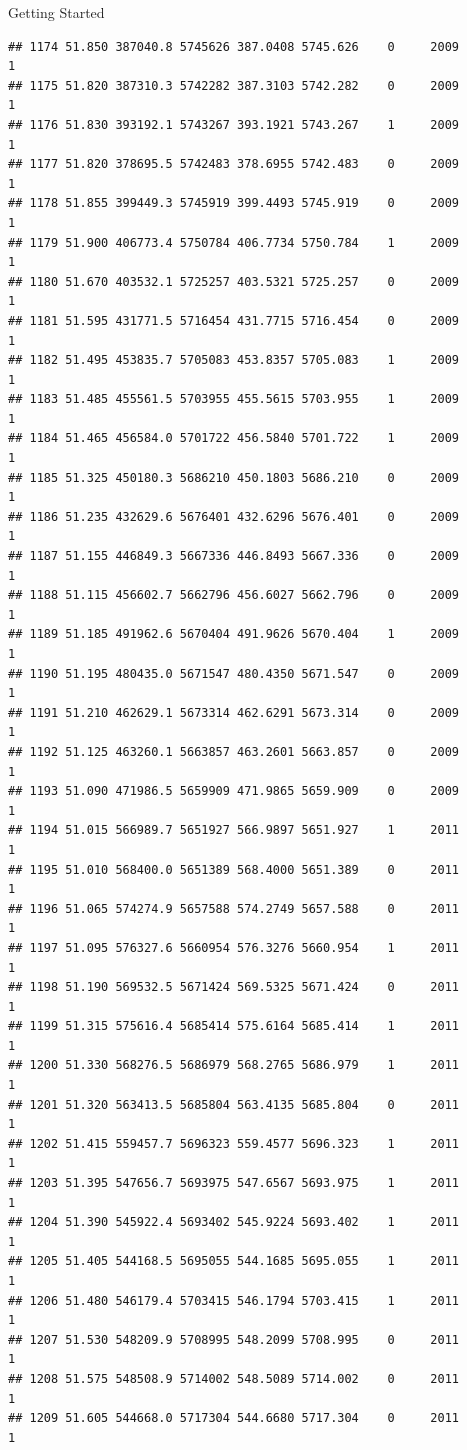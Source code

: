 \documentclass[
  ignorenonframetext,
]{beamer}
\begin{document}
\begin{frame}[fragile]{Getting Started}
\begin{verbatim}
## 1174 51.850 387040.8 5745626 387.0408 5745.626    0     2009        1
## 1175 51.820 387310.3 5742282 387.3103 5742.282    0     2009        1
## 1176 51.830 393192.1 5743267 393.1921 5743.267    1     2009        1
## 1177 51.820 378695.5 5742483 378.6955 5742.483    0     2009        1
## 1178 51.855 399449.3 5745919 399.4493 5745.919    0     2009        1
## 1179 51.900 406773.4 5750784 406.7734 5750.784    1     2009        1
## 1180 51.670 403532.1 5725257 403.5321 5725.257    0     2009        1
## 1181 51.595 431771.5 5716454 431.7715 5716.454    0     2009        1
## 1182 51.495 453835.7 5705083 453.8357 5705.083    1     2009        1
## 1183 51.485 455561.5 5703955 455.5615 5703.955    1     2009        1
## 1184 51.465 456584.0 5701722 456.5840 5701.722    1     2009        1
## 1185 51.325 450180.3 5686210 450.1803 5686.210    0     2009        1
## 1186 51.235 432629.6 5676401 432.6296 5676.401    0     2009        1
## 1187 51.155 446849.3 5667336 446.8493 5667.336    0     2009        1
## 1188 51.115 456602.7 5662796 456.6027 5662.796    0     2009        1
## 1189 51.185 491962.6 5670404 491.9626 5670.404    1     2009        1
## 1190 51.195 480435.0 5671547 480.4350 5671.547    0     2009        1
## 1191 51.210 462629.1 5673314 462.6291 5673.314    0     2009        1
## 1192 51.125 463260.1 5663857 463.2601 5663.857    0     2009        1
## 1193 51.090 471986.5 5659909 471.9865 5659.909    0     2009        1
## 1194 51.015 566989.7 5651927 566.9897 5651.927    1     2011        1
## 1195 51.010 568400.0 5651389 568.4000 5651.389    0     2011        1
## 1196 51.065 574274.9 5657588 574.2749 5657.588    0     2011        1
## 1197 51.095 576327.6 5660954 576.3276 5660.954    1     2011        1
## 1198 51.190 569532.5 5671424 569.5325 5671.424    0     2011        1
## 1199 51.315 575616.4 5685414 575.6164 5685.414    1     2011        1
## 1200 51.330 568276.5 5686979 568.2765 5686.979    1     2011        1
## 1201 51.320 563413.5 5685804 563.4135 5685.804    0     2011        1
## 1202 51.415 559457.7 5696323 559.4577 5696.323    1     2011        1
## 1203 51.395 547656.7 5693975 547.6567 5693.975    1     2011        1
## 1204 51.390 545922.4 5693402 545.9224 5693.402    1     2011        1
## 1205 51.405 544168.5 5695055 544.1685 5695.055    1     2011        1
## 1206 51.480 546179.4 5703415 546.1794 5703.415    1     2011        1
## 1207 51.530 548209.9 5708995 548.2099 5708.995    0     2011        1
## 1208 51.575 548508.9 5714002 548.5089 5714.002    0     2011        1
## 1209 51.605 544668.0 5717304 544.6680 5717.304    0     2011        1

\end{verbatim}
\end{frame}
\end{document}
